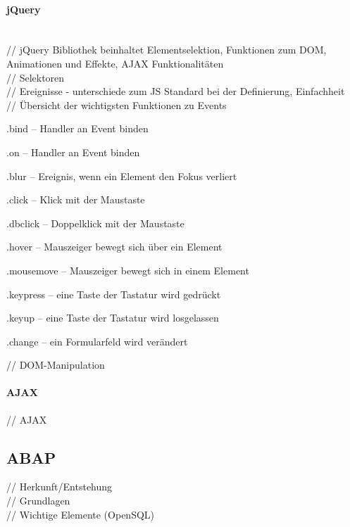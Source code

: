 \documentclass[12pt,a4paper,bibliography=totocnumbered,listof=totocnumbered]{scrartcl}
\begin{document}
\paragraph{jQuery}
$\;$ \\
// jQuery Bibliothek beinhaltet Elementselektion, Funktionen zum DOM, Animationen und Effekte, AJAX Funktionalitäten\\

// Selektoren\\

// Ereignisse - unterschiede zum JS Standard bei der Definierung, Einfachheit\\

// Übersicht der wichtigsten Funktionen zu Events
    \begin{compactitem}
	    \item .bind – Handler an Event binden
	    \item .on – Handler an Event binden
	    \item .blur – Ereignis, wenn ein Element den Fokus verliert
	    \item .click – Klick mit der Maustaste
	    \item .dbclick – Doppelklick mit der Maustaste
	    \item .hover – Mauszeiger bewegt sich über ein Element
	    \item .mousemove – Mauszeiger bewegt sich in einem Element
	    \item .keypress – eine Taste der Tastatur wird gedrückt
	    \item .keyup – eine Taste der Tastatur wird losgelassen
	    \item .change – ein Formularfeld wird verändert
    \end{compactitem}
    
// DOM-Manipulation\\

\paragraph{AJAX} // AJAX\\

\subsection{ABAP}
// Herkunft/Entstehung\\
// Grundlagen\\
// Wichtige Elemente (OpenSQL)\\
\end{document}
